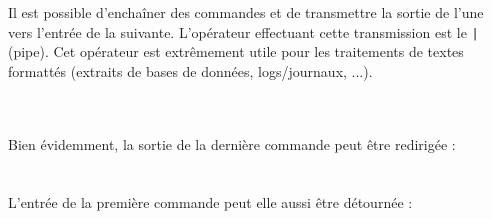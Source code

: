Il est possible d'enchaîner des commandes et de transmettre la sortie de l'une vers l'entrée de la suivante.
L'opérateur effectuant cette transmission est le \texttt{|} (pipe).
Cet opérateur est extrêmement utile pour les traitements de textes formattés (extraits de bases de données, logs/journaux, ...).\\

\\

\smallskip

\\

Bien évidemment, la sortie de la dernière commande peut être redirigée :\\

\\
\\

L'entrée de la première commande peut elle aussi être détournée :\\

\\
\\
\\
\\
\\


\setlength{\parindent}{\defaultparindent}	
